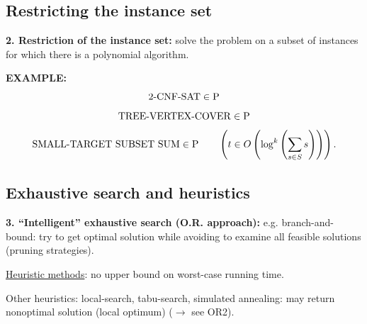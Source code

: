 \subsection{Restricting the instance set}
\textbf{2. Restriction of the instance set:} solve the problem on a subset of instances for which there is a polynomial algorithm.

\textbf{EXAMPLE:}
\[\mathrm{2\text{-}CNF\text{-}SAT}\in\mathrm{P}\]
\[\mathrm{TREE\text{-}VERTEX\text{-}COVER}\in\mathrm{P}\]
\[\mathrm{SMALL\text{-}TARGET\ SUBSET\ SUM}\in\classP\qquad
\left(t\in O\left(\log^k\left(\sum_{s\in S}s\right)\right)\right).\]
\subsection{Exhaustive search and heuristics}
\textbf{3. ``Intelligent'' exhaustive search (O.R. approach):} e.g. branch-and-bound: try to get optimal solution while avoiding to examine all feasible solutions (pruning strategies).

\underline{Heuristic methods}: no upper bound on worst-case running time.

Other heuristics: local-search, tabu-search, simulated annealing: may return nonoptimal solution (local optimum) ($\to$ see OR2).
